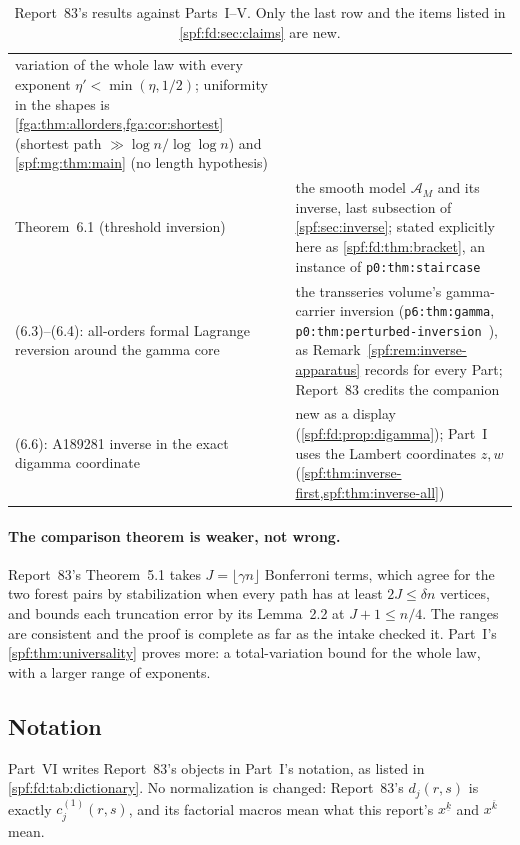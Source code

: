 \documentclass[11pt]{article}
\numberwithin{equation}{section}
\theoremstyle{definition}
\theoremstyle{remark}
\theoremstyle{definition}
\newcommand{\fall}[2]{{#1}^{\underline{#2}}}
\newcommand{\rise}[2]{{#1}^{\overline{#2}}}
\begin{document}
\begin{table}[htbp]
\begin{tabular}{@{}>{\raggedright\arraybackslash}p{}>{\raggedright\arraybackslash}p{}@{}}
variation of the whole law with every exponent $\eta'<\min(\eta,1/2)$;
uniformity in the shapes is \cref{fga:thm:allorders,fga:cor:shortest}
(shortest path $\gg\log n/\log\log n$) and \cref{spf:mg:thm:main} (no length
hypothesis)\\
Theorem~6.1 (threshold inversion) &
the smooth model $\mathcal A_M$ and its inverse, last subsection of
\cref{spf:sec:inverse}; stated explicitly here as
\cref{spf:fd:thm:bracket}, an instance of \texttt{p0:thm:staircase}~\cite{tai}\\
(6.3)--(6.4): all-orders formal Lagrange reversion around the gamma core &
the transseries volume's gamma-carrier inversion (\texttt{p6:thm:gamma},
\texttt{p0:thm:perturbed-inversion}~\cite{tai}), as
Remark~\ref{spf:rem:inverse-apparatus} records for every Part; Report~83
credits the companion\\
(6.6): A189281 inverse in the exact digamma coordinate &
new as a display (\cref{spf:fd:prop:digamma}); Part~I uses the Lambert
coordinates $z,w$ (\cref{spf:thm:inverse-first,spf:thm:inverse-all})\\
\bottomrule
\end{tabular}
\caption{Report~83's results against Parts~I--V. Only the last row and the
items listed in \cref{spf:fd:sec:claims} are new.}
\label{spf:fd:tab:routes}
\end{table}

\paragraph{The comparison theorem is weaker, not wrong.}
Report~83's Theorem~5.1 takes $J=\lfloor\gamma n\rfloor$ Bonferroni terms,
which agree for the two forest pairs by stabilization when every path has at
least $2J\le\delta n$ vertices, and bounds each truncation error by its
Lemma~2.2 at $J+1\le n/4$. The ranges are consistent and the proof is
complete as far as the intake checked it. Part~I's
\cref{spf:thm:universality} proves more: a total-variation bound for the
whole law, with a larger range of exponents.

\subsection{Notation}
\label{spf:fd:sec:notation}

Part~VI writes Report~83's objects in Part~I's notation, as listed in
\cref{spf:fd:tab:dictionary}. No normalization is changed: Report~83's
$d_j(r,s)$ is exactly $c_j^{(1)}(r,s)$, and its factorial macros mean what
this report's $\fall xk$ and $\rise xk$ mean.
\end{document}
